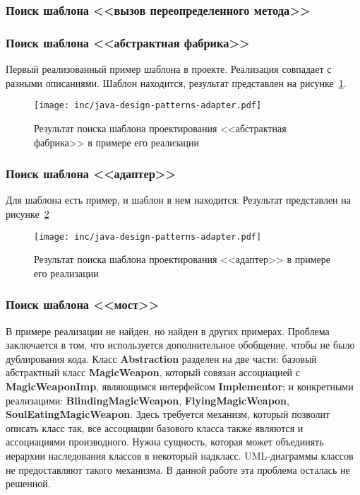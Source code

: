 \subsubsection*{Поиск шаблона <<вызов переопределенного метода>>}

\subsubsection*{Поиск шаблона <<абстрактная фабрика>>}

Первый реализованный пример шаблона в проекте.
Реализация совпадает с разными описаниями.
Шаблон находится, результат представлен на рисунке~\ref{fig:java-design-patterns-abstract-factory}.

\begin{figure}[!ht]
\centering
\texttt{[image: inc/java-design-patterns-adapter.pdf]}
\caption{Результат поиска шаблона проектирования <<абстрактная фабрика>> в примере его реализации}
\label{fig:java-design-patterns-abstract-factory}
\end{figure}

\subsubsection*{Поиск шаблона <<адаптер>>}

Для шаблона есть пример, и шаблон в нем находится.
Результат представлен на рисунке~\ref{fig:java-design-patterns-adapter}

\begin{figure}[!ht]
\centering
\texttt{[image: inc/java-design-patterns-adapter.pdf]}
\caption{Результат поиска шаблона проектирования <<адаптер>> в примере его реализации}
\label{fig:java-design-patterns-adapter}
\end{figure}

\subsubsection*{Поиск шаблона <<мост>>}

В примере реализации не найден, но найден в других примерах.
Проблема заключается в том, что используется дополнительное обобщение,
чтобы не было дублирования кода.
Класс \textbf{Abstraction} разделен на две части: базовый абстрактный класс
\textbf{MagicWeapon},
который совязан ассоциацией с \textbf{MagicWeaponImp},
являющимся интерфейсом \textbf{Implementor};
и конкретными реализацими: \textbf{BlindingMagicWeapon},
\textbf{FlyingMagicWeapon}, \textbf{SoulEatingMagicWeapon}.
Здесь требуется механизм, который позволит описать класс так,
все ассоциации базового класса также являются и ассоциациями производного.
Нужна сущность, которая может объединять иерархии наследования классов в
некоторый надкласс.
UML-диаграммы классов не предоставляют такого механизма.
В данной работе эта проблема осталась не решенной.

